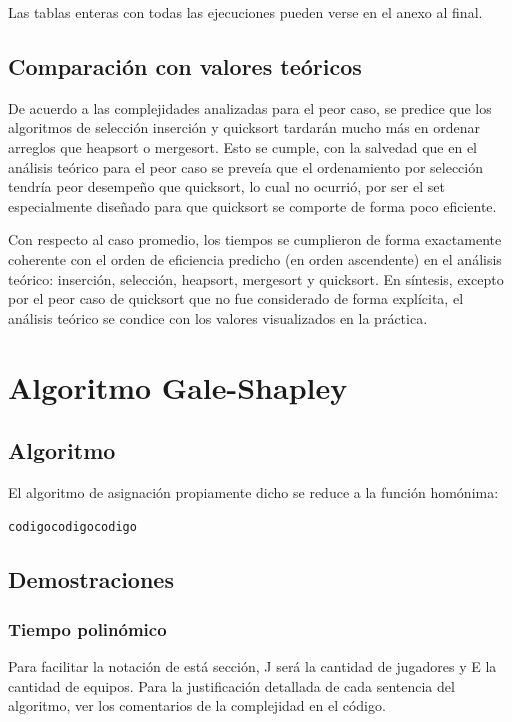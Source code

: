 \documentclass[article,a4paper]{article}
\begin{document}
Las tablas enteras con todas las ejecuciones pueden verse en el anexo al final.


\subsection{Comparación con valores teóricos}

De acuerdo a las complejidades analizadas para el peor caso, se predice que los algoritmos de selección inserción y quicksort tardarán mucho más en ordenar arreglos que heapsort o mergesort. Esto se cumple, con la salvedad que en el análisis teórico para el peor caso se preveía que el ordenamiento por selección tendría peor desempeño que quicksort, lo cual no ocurrió, por ser el set especialmente diseñado para que quicksort se comporte de forma poco eficiente.

Con respecto al caso promedio, los tiempos se cumplieron de forma exactamente coherente con el orden de eficiencia predicho (en orden ascendente) en el análisis teórico: inserción, selección, heapsort, mergesort y quicksort. En síntesis, excepto por el peor caso de quicksort que no fue considerado de forma explícita, el análisis teórico se condice con los valores visualizados en la práctica.


\section{Algoritmo Gale-Shapley}

\subsection{Algoritmo}

El algoritmo de asignación propiamente dicho se reduce a la función homónima:

\begin{verbatim}
codigocodigocodigo
\end{verbatim}

\subsection{Demostraciones}

\subsubsection{Tiempo polinómico}

Para facilitar la notación de está sección, J será la cantidad de jugadores y E la cantidad de equipos. Para la justificación detallada de cada sentencia del algoritmo, ver los comentarios de la complejidad en el código.
\end{document}
